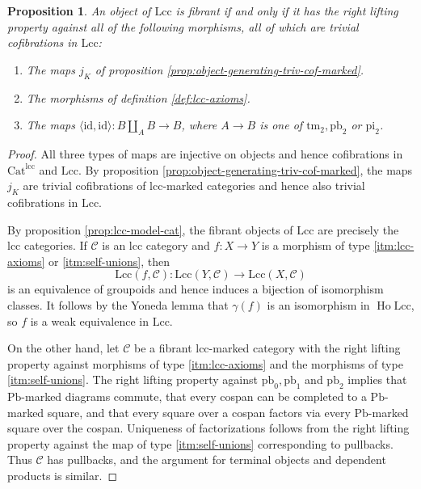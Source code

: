 \documentclass[a4paper]{article}
\newtheorem{proposition}[theorem]{Proposition}
\theoremstyle{remark}
\theoremstyle{definition}
\begin{document}
\begin{proposition}
  \label{prop:object-generating-triv-cof-lcc}
  An object of $\mathrm{Lcc}$ is fibrant if and only if it has the right lifting property against all of the following morphisms, all of which are trivial cofibrations in $\mathrm{Lcc}$:
  \begin{enumerate}[label={(\arabic*)}]
    \item
      \label{itm:marking-stability}
      The maps $j_K$ of proposition \ref{prop:object-generating-triv-cof-marked}.
    \item
      \label{itm:lcc-axioms}
      The morphisms of definition \ref{def:lcc-axioms}.
    \item
      \label{itm:self-unions}
      The maps $\langle \mathrm{id}, \mathrm{id} \rangle : B \amalg_A B \rightarrow B$, where $A \rightarrow B$  is one of $\mathrm{tm}_2, \mathrm{pb}_2$ or $\mathrm{pi}_2$.
  \end{enumerate}
\end{proposition}
\begin{proof}
  All three types of maps are injective on objects and hence cofibrations in $\mathrm{Cat}^{\mathrm{lcc}}$ and $\mathrm{Lcc}$.
  By proposition \ref{prop:object-generating-triv-cof-marked}, the maps $j_K$ are trivial cofibrations of lcc-marked categories and hence also trivial cofibrations in $\mathrm{Lcc}$.

  By proposition \ref{prop:lcc-model-cat}, the fibrant objects of $\mathrm{Lcc}$ are precisely the lcc categories. 
  If $\mathcal{C}$ is an lcc category and $f : X \rightarrow Y$ is a morphism of type \ref{itm:lcc-axioms} or \ref{itm:self-unions}, then 
  \begin{equation}
    \mathrm{Lcc}(f, \mathcal{C}) : \mathrm{Lcc}(Y, \mathcal{C}) \rightarrow \mathrm{Lcc}(X, \mathcal{C})
  \end{equation}
  is an equivalence of groupoids and hence induces a bijection of isomorphism classes.
  It follows by the Yoneda lemma that $\gamma(f)$ is an isomorphism in $\operatorname{Ho} \mathrm{Lcc}$, so $f$ is  a weak equivalence in $\mathrm{Lcc}$.

  On the other hand, let $\mathcal{C}$ be a fibrant lcc-marked category with the right lifting property against morphisms of type \ref{itm:lcc-axioms} and the morphisms of type \ref{itm:self-unions}.
  The right lifting property against $\mathrm{pb}_0, \mathrm{pb}_1$ and $\mathrm{pb}_2$ implies that $\mathrm{Pb}$-marked diagrams commute, that every cospan can be completed to a $\mathrm{Pb}$-marked square, and that every square over a cospan factors via every $\mathrm{Pb}$-marked square over the cospan.
  Uniqueness of factorizations follows from the right lifting property against the map of type \ref{itm:self-unions} corresponding to pullbacks.
  Thus $\mathcal{C}$ has pullbacks, and the argument for terminal objects and dependent products is similar.
\end{proof}
\end{document}
